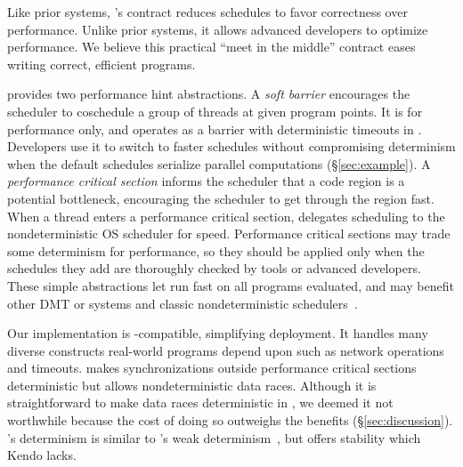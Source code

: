 Like prior systems, \parrot's contract reduces schedules to favor correctness 
over performance.  Unlike prior systems, it allows advanced developers
to optimize performance.  We believe this practical ``meet in the
middle'' contract eases writing correct, efficient programs.



\parrot provides two performance hint abstractions.  A \emph{soft
  barrier} encourages the scheduler to coschedule a group of threads at
given program points.  It is for performance only, and operates as a
barrier with deterministic timeouts in \parrot.  Developers use it to switch
to faster schedules without compromising determinism
when the default schedules serialize parallel
computations (\S\ref{sec:example}).  A \emph{performance critical section}
informs the scheduler that a code region is a potential
bottleneck, encouraging the scheduler to get through the region fast.
When a thread enters a performance critical section, \parrot delegates 
scheduling to the
nondeterministic OS scheduler for speed.  
Performance critical sections may trade some determinism for
performance, so they should be applied only when the schedules they add
are thoroughly checked by tools or advanced developers.
These simple abstractions
let \parrot run fast on all programs evaluated, and
may benefit other DMT or \smt systems and classic nondeterministic
schedulers~\cite{coschedule:sigmetrics96, coschedule, partial-barrier:atc06}.

Our \parrot implementation is \pthread-compatible, simplifying deployment.
It handles many diverse constructs real-world programs depend upon such as
network operations and timeouts.  \parrot makes synchronizations outside
performance critical sections deterministic but allows nondeterministic
data races.  Although it is
straightforward to make data races deterministic in \parrot,
we deemed it not worthwhile because the cost of doing so outweighs the
benefits (\S\ref{sec:discussion}).  \parrot's determinism is similar to
\kendo's weak determinism~\cite{kendo:asplos09}, but \parrot offers stability
which Kendo lacks.


